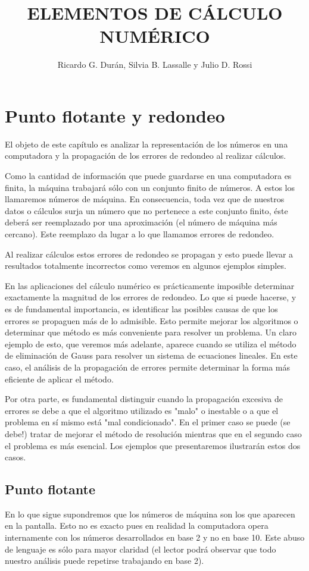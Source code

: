 \documentclass[10pt]{book}
\title{ELEMENTOS DE CÁLCULO NUMÉRICO }
\author{Ricardo G. Durán, Silvia B. Lassalle y Julio D. Rossi}
\date{}
\begin{document}
\maketitle
\captionsetup{singlelinecheck=false}

\tableofcontents
\cleardoublepage


\chapter{Punto flotante y redondeo}
El objeto de este capítulo es analizar la representación de los números en una computadora y la propagación de los errores de redondeo al realizar cálculos.

Como la cantidad de información que puede guardarse en una computadora es finita, la máquina trabajará sólo con un conjunto finito de números. A estos los llamaremos números de máquina. En consecuencia, toda vez que de nuestros datos o cálculos surja un número que no pertenece a este conjunto finito, éste deberá ser reemplazado por una aproximación (el número de máquina más cercano). Este reemplazo da lugar a lo que llamamos errores de redondeo.

Al realizar cálculos estos errores de redondeo se propagan y esto puede llevar a resultados totalmente incorrectos como veremos en algunos ejemplos simples.

En las aplicaciones del cálculo numérico es prácticamente imposible determinar exactamente la magnitud de los errores de redondeo. Lo que si puede hacerse, y es de fundamental importancia, es identificar las posibles causas de que los errores se propaguen más de lo admisible. Esto permite mejorar los algoritmos o determinar que método es más conveniente para resolver un problema. Un claro ejemplo de esto, que veremos más adelante, aparece cuando se utiliza el método de eliminación de Gauss para resolver un sistema de ecuaciones lineales. En este caso, el análisis de la propagación de errores permite determinar la forma más eficiente de aplicar el método.

Por otra parte, es fundamental distinguir cuando la propagación excesiva de errores se debe a que el algoritmo utilizado es "malo" o inestable o a que el problema en sí mismo está "mal condicionado". En el primer caso se puede (se debe!) tratar de mejorar el método de resolución mientras que en el segundo caso el problema es más esencial. Los ejemplos que presentaremos ilustrarán estos dos casos.

\section{Punto flotante}
En lo que sigue supondremos que los números de máquina son los que aparecen en la pantalla. Esto no es exacto pues en realidad la computadora opera internamente con los números desarrollados en base 2 y no en base 10. Este abuso de lenguaje es sólo para mayor claridad (el lector podrá observar que todo nuestro análisis puede repetirse trabajando en base 2).
\end{document}
